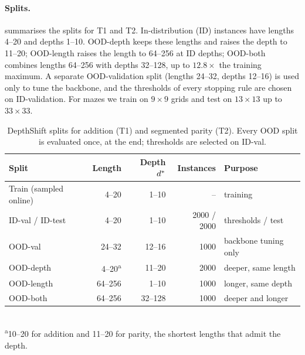\paragraph{Splits.}  summarises the splits for T1 and T2. In-distribution (ID)
instances have lengths 4--20 and depths 1--10. OOD-depth keeps these lengths and raises the depth to
11--20; OOD-length raises the length to 64--256 at ID depths; OOD-both combines lengths 64--256 with
depths 32--128, up to $12.8\times$ the training maximum. A separate OOD-validation split (lengths
24--32, depths 12--16) is used only to tune the backbone, and the thresholds of every stopping rule are
chosen on ID-validation. For mazes we train on $9\times 9$ grids and test on $13\times13$ up to
$33\times33$.

\begin{table}[t]
  \centering
  \caption{DepthShift splits for addition (T1) and segmented parity (T2). Every OOD split is evaluated
  once, at the end; thresholds are selected on ID-val.}
  \label{tab:splits}
  \small
  \begin{tabular}{lrrrl}
    \toprule
    Split & Length & Depth $d^{*}$ & Instances & Purpose \\
    \midrule
    Train (sampled online) & 4--20 & 1--10 & -- & training \\
    ID-val / ID-test & 4--20 & 1--10 & 2000 / 2000 & thresholds / test \\
    OOD-val & 24--32 & 12--16 & 1000 & backbone tuning only \\
    OOD-depth & 4--20\textsuperscript{a} & 11--20 & 2000 & deeper, same length \\
    OOD-length & 64--256 & 1--10 & 1000 & longer, same depth \\
    OOD-both & 64--256 & 32--128 & 1000 & deeper and longer \\
    \bottomrule
  \end{tabular}\\[2pt]
  {\footnotesize \textsuperscript{a}10--20 for addition and 11--20 for parity, the shortest lengths that admit the depth.}
\end{table}
